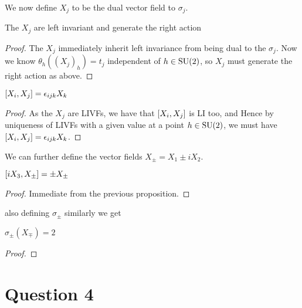 \documentclass{article}
\begin{document}
We now define $X_j$ to be the dual vector field to $\sigma_j$. 

\begin{prop}
The $X_j$ are left invariant and generate the right action 
\end{prop}
\begin{proof}
The $X_j$ immediately inherit left invariance from being dual to the $\sigma_j$. Now we know $\theta_h((X_j)_h) = t_j$ independent of $h \in \SU(2)$, so $X_j$ must generate the right action as above. 
\end{proof}

\begin{prop}
$\comm[X_i]{X_j} = \eps_{ijk} X_k$
\end{prop}
\begin{proof}
As the $X_j$ are LIVFs, we have that $\comm[X_i]{X_j}$ is LI too, and 
Hence by uniqueness of LIVFs with a given value at a point $h \in \SU(2)$, we must have $\comm[X_i]{X_j} = \eps_{ijk} X_k$. 
\end{proof}

We can further define the vector fields $X_\pm = X_1 \pm i X_2$. 

\begin{prop}
$\comm[iX_3]{X_\pm}=\pm X_\pm$
\end{prop}
\begin{proof}
Immediate from the previous proposition. 
\end{proof}

also defining $\sigma_\pm$ similarly we get

\begin{prop}
$\sigma_\pm(X_\mp) = 2$
\end{prop}
\begin{proof}
\end{proof}

\section{Question 4}

\end{document}
